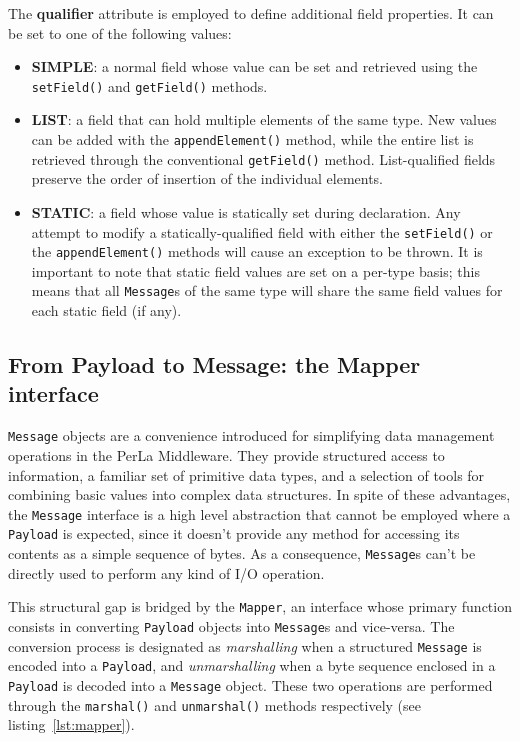 The \textbf{qualifier} attribute is employed to define additional field
properties. It can be set to one of the following values:
\begin{itemize}
  \item \textbf{SIMPLE}: a normal field whose value can be set and retrieved
  using the \texttt{setField()} and \texttt{getField()} methods.
  \item \textbf{LIST}: a field that can hold multiple elements of the same
  type. New values can be added with the \texttt{appendElement()} method, while
  the entire list is retrieved through the conventional \texttt{getField()}
  method. List-qualified fields preserve the order of insertion of the
  individual elements.
  \item \textbf{STATIC}: a field whose value is statically set during
  declaration.  Any attempt to modify a statically-qualified field with either
  the \texttt{setField()} or the \texttt{appendElement()} methods will cause an
  exception to be thrown. It is important to note that static field values are
  set on a per-type basis; this means that all \texttt{Message}s of the same
  type will share the same field values for each static field (if any). 
\end{itemize}


\subsection{From Payload to Message: the Mapper interface}

\texttt{Message} objects are a convenience introduced for simplifying data
management operations in the PerLa Middleware. They provide structured access
to information, a familiar set of primitive data types, and a selection of
tools for combining basic values into complex data structures. In spite of
these advantages, the \texttt{Message} interface is a high level abstraction
that cannot be employed where a \texttt{Payload} is expected, since it doesn't
provide any method for accessing its contents as a simple sequence of bytes.
As a consequence, \texttt{Message}s can't be directly used to perform any kind
of I/O operation.

This structural gap is bridged by the \texttt{Mapper}, an interface whose
primary function consists in converting \texttt{Payload} objects into
\texttt{Message}s and vice-versa. The conversion process is designated as
\textit{marshalling} when a structured \texttt{Message} is encoded into a
\texttt{Payload}, and \textit{unmarshalling} when a byte sequence enclosed in a
\texttt{Payload} is decoded into a \texttt{Message} object. These two
operations are performed through the \texttt{marshal()} and
\texttt{unmarshal()} methods respectively (see listing~\ref{lst:mapper}).


